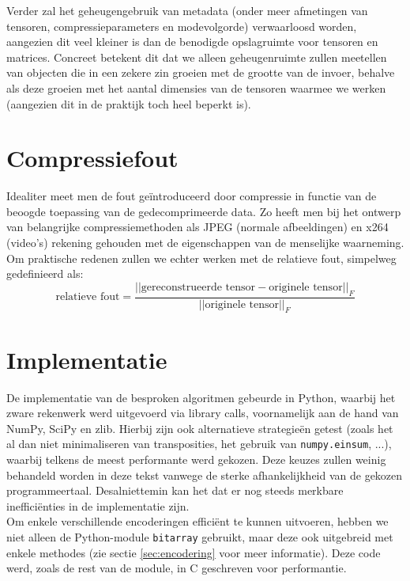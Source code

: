 Verder zal het geheugengebruik van metadata (onder meer afmetingen van tensoren, compressieparameters en modevolgorde) verwaarloosd worden, aangezien dit veel kleiner is dan de benodigde opslagruimte voor tensoren en matrices. Concreet betekent dit dat we alleen geheugenruimte zullen meetellen van objecten die in een zekere zin groeien met de grootte van de invoer, behalve als deze groeien met het aantal dimensies van de tensoren waarmee we werken (aangezien dit in de praktijk toch heel beperkt is).

\section{Compressiefout}

Idealiter meet men de fout ge\"introduceerd door compressie in functie van de beoogde toepassing van de gedecomprimeerde data. Zo heeft men bij het ontwerp van belangrijke compressiemethoden als JPEG \cite{ref:jpeg} (normale afbeeldingen) en x264 \cite{ref:x264} (video's) rekening gehouden met de eigenschappen van de menselijke waarneming. Om praktische redenen zullen we echter werken met de relatieve fout, simpelweg gedefinieerd als:
\[
\text{relatieve fout} = \frac{||\text{gereconstrueerde tensor} - \text{originele tensor}||_F}{||\text{originele tensor}||_F}
\]

\section{Implementatie}

De implementatie van de besproken algoritmen gebeurde in Python, waarbij het zware rekenwerk werd uitgevoerd via library calls, voornamelijk aan de hand van NumPy, SciPy en zlib. Hierbij zijn ook alternatieve strategie\"en getest (zoals het al dan niet minimaliseren van transposities, het gebruik van \texttt{numpy.einsum}, ...), waarbij telkens de meest performante werd gekozen. Deze keuzes zullen weinig behandeld worden in deze tekst vanwege de sterke afhankelijkheid van de gekozen programmeertaal. Desalniettemin kan het dat er nog steeds merkbare ineffici\"enties in de implementatie zijn.\\

Om enkele verschillende encoderingen effici\"ent te kunnen uitvoeren, hebben we niet alleen de Python-module \texttt{bitarray} \cite{ref:bitarray} gebruikt, maar deze ook uitgebreid met enkele methodes (zie sectie \ref{sec:encodering} voor meer informatie). Deze code werd, zoals de rest van de module, in C geschreven voor performantie.\\

